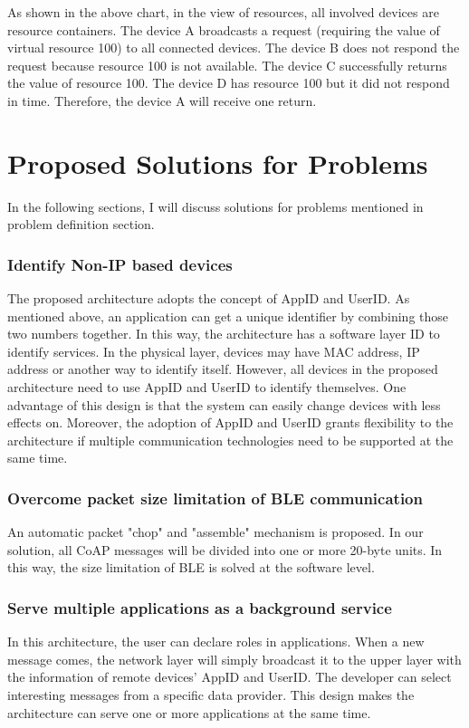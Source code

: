 \documentclass{Nan_Thesis}
\begin{document}
As shown in the above chart, in the view of resources, all involved devices are resource containers. The device A broadcasts a request (requiring the value of virtual resource 100) to all connected devices. The device B does not respond the request because resource 100 is not available. The device C successfully returns the value of resource 100. The device D has resource 100 but it did not respond in time. Therefore, the device A will receive one return.

\section{Proposed Solutions for Problems}
In the following sections, I will discuss solutions for problems mentioned in problem definition section.
\subsubsection{Identify Non-IP based devices}
The proposed architecture adopts the concept of AppID and UserID. As mentioned above, an application can get a unique identifier by combining those two numbers together. In this way, the architecture has a software layer ID to identify services. In the physical layer, devices may have MAC address, IP address or another way to identify itself. However, all devices in the proposed architecture need to use AppID and UserID to identify themselves. One advantage of this design is that the system can easily change devices with less effects on. Moreover, the adoption of AppID and UserID grants flexibility to the architecture if multiple communication technologies need to be supported at the same time.
\subsubsection{Overcome packet size limitation of BLE communication}
An automatic packet "chop" and "assemble" mechanism is proposed. In our solution, all CoAP messages will be divided into one or more 20-byte units. In this way, the size limitation of BLE is solved at the software level.
\subsubsection{Serve multiple applications as a background service}
In this architecture, the user can declare roles in applications. When a new message comes, the network layer will simply broadcast it to the upper layer with the information of remote devices’ AppID and UserID. The developer can select interesting messages from a specific data provider. This design makes the architecture can serve one or more applications at the same time.
\end{document}
